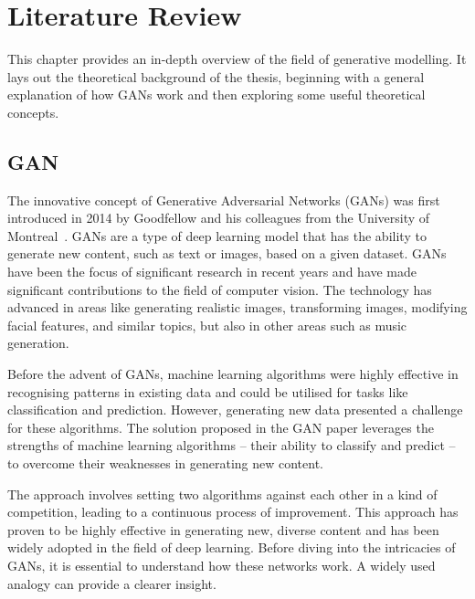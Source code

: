 \newpage
\section{Literature Review}
\label{section:literatureReviewChapter}
This chapter provides an in-depth overview of the field of generative modelling. It lays out the theoretical background of the thesis, beginning with a general explanation of how GANs work and then exploring some useful theoretical concepts.

\subsection{GAN}
The innovative concept of Generative Adversarial Networks (GANs) was first introduced in 2014 by Goodfellow and his colleagues from the University of Montreal~\cite{GANGoodfellow}. GANs are a type of deep learning model that has the ability to generate new content, such as text or images, based on a given dataset. GANs have been the focus of significant research in recent years and have made significant contributions to the field of computer vision. The technology has advanced in areas like generating realistic images, transforming images, modifying facial features, and similar topics, but also in other areas such as music generation.

\noindent Before the advent of GANs, machine learning algorithms were highly effective in recognising patterns in existing data and could be utilised for tasks like classification and prediction. However, generating new data presented a challenge for these algorithms. The solution proposed in the GAN paper leverages the strengths of machine learning algorithms – their ability to classify and predict – to overcome their weaknesses in generating new content.

\noindent The approach involves setting two algorithms against each other in a kind of competition, leading to a continuous process of improvement. This approach has proven to be highly effective in generating new, diverse content and has been widely adopted in the field of deep learning.
Before diving into the intricacies of GANs, it is essential to understand how these networks work. A widely used analogy can provide a clearer insight.\\

